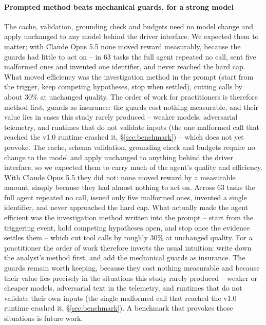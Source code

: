 \paragraph{Prompted method beats mechanical guards, for a strong model} \ifconf
The cache, validation, grounding
check and budgets need no model change and apply unchanged to any model behind the driver interface. We expected
them to matter; with Claude Opus 5.5 none moved reward measurably, because the guards had little to act on -- in
63 tasks the full agent repeated no call, sent five malformed ones and invented one identifier, and never reached
the hard cap. What moved efficiency was the investigation method in the prompt (start from the trigger, keep
competing hypotheses, stop when settled), cutting calls by about 30\% at unchanged quality. The order of work for
practitioners is therefore method first, guards as insurance: the guards cost nothing measurable, and their value
lies in cases this study rarely produced -- weaker models, adversarial telemetry, and runtimes that do not
validate inputs (the one malformed call that reached the v1.0 runtime crashed it, \S\ref{sec:benchmark}) -- which
\bench does not yet provoke.
\else
The cache, schema validation, grounding check and budgets require no change to the model and apply unchanged to
anything behind the driver interface, so we expected them to carry much of the agent's quality and efficiency.
With Claude Opus 5.5 they did not: none moved reward by a measurable amount, simply because they had almost nothing
to act on. Across 63 tasks the full agent repeated no call, issued only five malformed ones, invented a single
identifier, and never approached the hard cap. What actually made the agent efficient was the investigation method
written into the prompt -- start from the triggering event, hold competing hypotheses open, and stop once the
evidence settles them -- which cut tool calls by roughly 30\% at unchanged quality. For a practitioner the order of
work therefore inverts the usual intuition: write down the analyst's method first, and add the mechanical guards as
insurance. The guards remain worth keeping, because they cost nothing measurable and because their value lies
precisely in the situations this study rarely produced -- weaker or cheaper models, adversarial text in the
telemetry, and runtimes that do not validate their own inputs (the single malformed call that reached the v1.0
runtime crashed it, \S\ref{sec:benchmark}). A benchmark that provokes those situations is future work.
\fi

\ifconf\else
